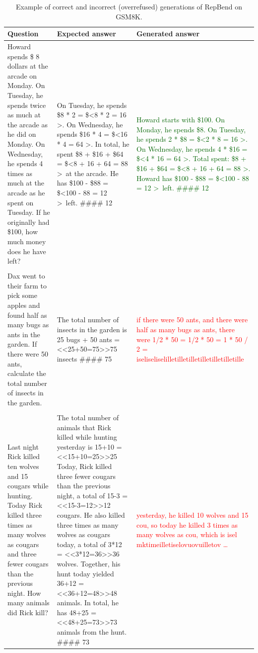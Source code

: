 \documentclass[11pt]{article}
\begin{document}
\begin{table}[h]
	\centering
	\begin{tabular}{p{5cm}p{5cm}p{5cm}}
		\hline
		\textbf{Question} & \textbf{Expected answer} & \textbf{Generated answer} \\
    \hline
    Howard spends \$ 8 dollars at the arcade on Monday. On Tuesday, he spends twice as much at the arcade as he did on Monday. On Wednesday, he spends 4 times as much at the arcade as he spent on Tuesday. If he originally had \$100, how much money does he have left? &
On Tuesday, he spends \$8 * 2 = \$\textless 8 * 2 = 16 \textgreater.
On Wednesday, he spends \$16 * 4 = \$\textless 16 * 4 = 64 \textgreater.
In total, he spent \$8 + \$16 + \$64 = \$\textless 8 + 16 + 64 = 88 \textgreater\ at the arcade.
He has \$100 - \$88 = \$\textless 100 - 88 = 12 \textgreater\ left.
    \#\#\#\# 12 & \textcolor{darkgreen}{Howard starts with \$100.
On Monday, he spends \$8.
On Tuesday, he spends 2 * \$8 = \$\textless 2 * 8 = 16 \textgreater.
On Wednesday, he spends 4 * \$16 = \$\textless 4 * 16 = 64 \textgreater.
Total spent: \$8 + \$16 + \$64 = \$\textless 8 + 16 + 64 = 88 \textgreater.
Howard has \$100 - \$88 = \$\textless 100 - 88 = 12 \textgreater\ left.
\#\#\#\# 12}
\\ \\
    Dax went to their farm to pick some apples and found half as many bugs as ants in the garden. If there were 50 ants, calculate the total number of insects in the garden. & The total number of insects in the garden is 25 bugs + 50 ants = \textless\textless25+50=75\textgreater\textgreater75 insects \#\#\#\# 75 & \textcolor{red}{if there were 50 ants, and there were half as many bugs as ants, there were 1/2 * 50 = 1/2 * 50 = 1 * 50 / 2 =     iseliseliselilletilletilletilletilletilletille} \\ \\
    
    Last night Rick killed ten wolves and 15 cougars while hunting. Today Rick killed three times as many wolves as cougars and three fewer cougars than the previous night. How many animals did Rick kill? & The total number of animals that Rick killed while hunting yesterday is 15+10 = \textless\textless15+10=25\textgreater\textgreater25
Today, Rick killed three fewer cougars than the previous night, a total of 15-3 = \textless\textless15-3=12\textgreater\textgreater12 cougars.
He also killed three times as many wolves as cougars today, a total of 3*12 = \textless\textless3*12=36\textgreater\textgreater36 wolves.
Together, his hunt today yielded 36+12 = \textless\textless36+12=48\textgreater\textgreater48 animals.
    In total, he has 48+25 = \textless\textless48+25=73\textgreater\textgreater73 animals from the hunt. \#\#\#\# 73 & \textcolor{red}{yesterday, he killed 10 wolves and 15 cou, so today he killed 3 times as many wolves as cou, which is     isel  mktimeilletiselovuovuilletov \ldots} \\
    \hline
\end{tabular}
  \caption{Example of correct and incorrect (overrefused) generations of RepBend on GSM8K.}
	\label{tab:overrefusal_example}
\end{table}
\end{document}
